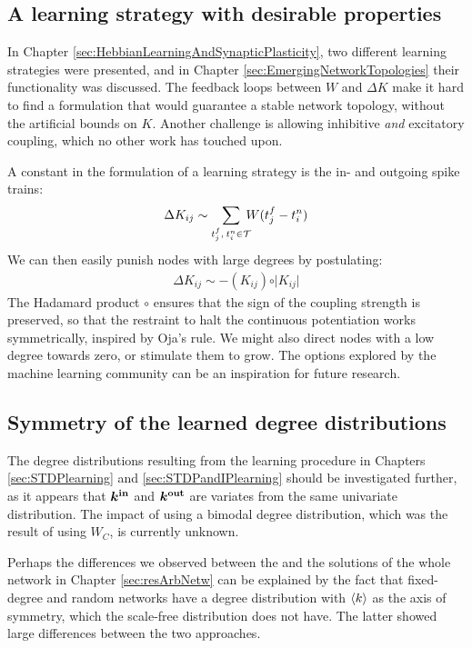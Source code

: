 \subsection{A learning strategy with desirable properties}
In Chapter \ref{sec:HebbianLearningAndSynapticPlasticity}, two different learning strategies were presented, and in Chapter \ref{sec:EmergingNetworkTopologies} their functionality was discussed. The feedback loops between $W$ and $\Delta K$ make it hard to find a formulation that would guarantee a stable network topology, without the artificial bounds on $K$. Another challenge is allowing inhibitive \textsl{and} excitatory coupling, which no other work has touched upon.

A constant in the formulation of a learning strategy is the in- and outgoing spike trains: 
\begin{align}
\Delta K_{ij} \sim \sum_{t_{j}^{f}, \: t_i^{n} \in \mathcal{T}} \hspace{-2mm} W (t_{j}^{f}-t_i^{n} )
\end{align}
We can then easily punish nodes with large degrees by postulating:
\begin{align}
\Delta K_{ij} \sim - (K_{ij}) \circ \rvert K_{ij} \rvert
\end{align}
The Hadamard product $\circ$ ensures that the sign of the coupling strength is preserved, so that the restraint to halt the continuous potentiation works symmetrically, inspired by Oja's rule\cite{ChrolCannon2014}. We might also direct nodes with a low degree towards zero, or stimulate them to grow. The options explored by the machine learning community can be an inspiration for future research.


\subsection{Symmetry of the learned degree distributions}
The degree distributions resulting from the learning procedure in Chapters \ref{sec:STDPlearning} and \ref{sec:STDPandIPlearning} should be investigated further, as it appears that ${\boldsymbol{k^{\rm in}}}$ and $\boldsymbol{{k^{\rm out}}}$ are variates from the same univariate distribution. The impact of using a bimodal degree distribution, which was the result of using $W_C$, is currently unknown.

Perhaps the differences we observed between the \MFR and the solutions of the whole network in Chapter \ref{sec:resArbNetw} can be explained by the fact that fixed-degree and random networks have a degree distribution with ${\langle k\rangle}$ as the axis of symmetry, which the scale-free distribution does not have. The latter showed large differences between the two approaches.



